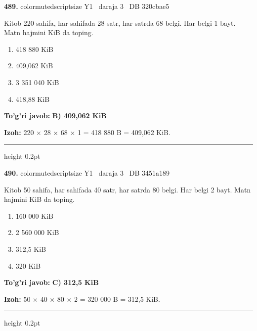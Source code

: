 \documentclass[10pt,a4paper,oneside]{article}
\begin{document}
\noindent\textbf{\color{ink}489.}  {color{muted}scriptsize Y1 \textbullet\ daraja 3 \textbullet\ DB 320cbae5}
\par
Kitob 220 sahifa, har sahifada 28 satr, har satrda 68 belgi. Har belgi 1 bayt. Matn hajmini KiB da toping.
\begin{enumerate}[label=\Alph*),leftmargin=9mm]
\item 418 880 KiB
\item 409,062 KiB
\item 3 351 040 KiB
\item 418,88 KiB
\end{enumerate}
\begin{tcolorbox}[enhanced,breakable,colback=teal!4,colframe=teal!50!black,boxrule=0.5pt,arc=1.1mm,left=3mm,right=3mm,top=1.7mm,bottom=1.7mm,before skip=2mm,after skip=2mm]
\textbf{\color{teal}To'g'ri javob:} \textbf{B) 409,062 KiB}
\par\smallskip
\textbf{Izoh:} 220 \ensuremath{\times} 28 \ensuremath{\times} 68 \ensuremath{\times} 1 = 418 880 B = 409,062 KiB.
\end{tcolorbox}
\vspace{2mm}\hrule height 0.2pt \vspace{3mm}

\noindent\textbf{\color{ink}490.}  {color{muted}scriptsize Y1 \textbullet\ daraja 3 \textbullet\ DB 3451a189}
\par
Kitob 50 sahifa, har sahifada 40 satr, har satrda 80 belgi. Har belgi 2 bayt. Matn hajmini KiB da toping.
\begin{enumerate}[label=\Alph*),leftmargin=9mm]
\item 160 000 KiB
\item 2 560 000 KiB
\item 312,5 KiB
\item 320 KiB
\end{enumerate}
\begin{tcolorbox}[enhanced,breakable,colback=teal!4,colframe=teal!50!black,boxrule=0.5pt,arc=1.1mm,left=3mm,right=3mm,top=1.7mm,bottom=1.7mm,before skip=2mm,after skip=2mm]
\textbf{\color{teal}To'g'ri javob:} \textbf{C) 312,5 KiB}
\par\smallskip
\textbf{Izoh:} 50 \ensuremath{\times} 40 \ensuremath{\times} 80 \ensuremath{\times} 2 = 320 000 B = 312,5 KiB.
\end{tcolorbox}
\vspace{2mm}\hrule height 0.2pt \vspace{3mm}
\end{document}
